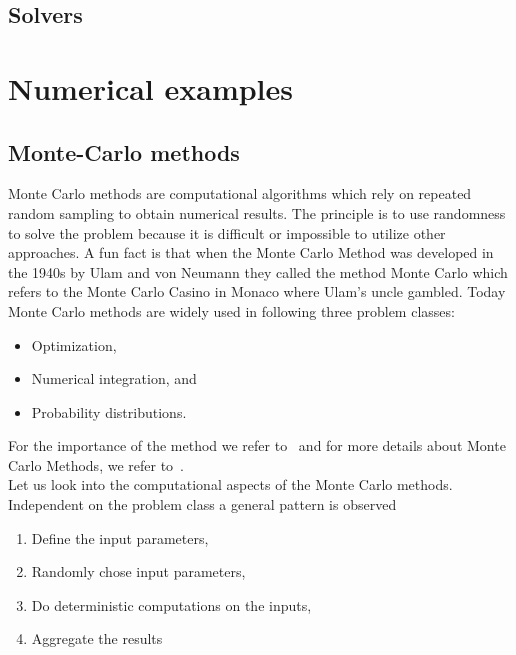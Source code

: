 \documentclass[11pt,fleqn]{book} %
\begin{document}
\chapter{Solvers}

\part{Numerical examples}
\label{part:numerical:examples}

\chapter{Monte-Carlo methods}
\label{sec:monte:carlo}
Monte Carlo methods are computational algorithms which rely on repeated random sampling to obtain numerical results. The principle is to use randomness to solve the problem because it is difficult or impossible to utilize other approaches. A fun fact is that when the Monte Carlo Method was developed in the 1940s by Ulam and von Neumann they called the method Monte Carlo which refers to the Monte Carlo Casino in Monaco where Ulam's uncle gambled. Today Monte Carlo methods are widely used in following three problem classes:
\begin{itemize}
\item Optimization,
\item Numerical integration, and
\item Probability distributions.
\end{itemize}
For the importance of the method we refer to~\cite{kroese2014monte} and for more details about Monte Carlo Methods, we refer to~\cite{shonkwiler2009explorations}.\\

Let us look into the computational aspects of the Monte Carlo methods. Independent on the problem class a general pattern is observed
\begin{enumerate}
\item Define the input parameters,
\item Randomly chose input parameters,
\item Do deterministic computations on the inputs,
\item Aggregate the results
\end{enumerate}
\end{document}
